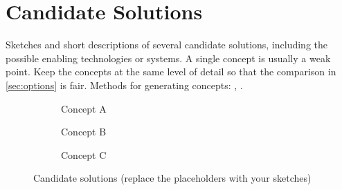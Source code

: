 \section{Candidate Solutions}
\label{sec:concepts}

\begin{guidance}
Sketches and short descriptions of several candidate solutions, including
the possible enabling technologies or systems. A single concept is usually a
weak point. Keep the concepts at the same level of detail so that the
comparison in \cref{sec:options} is fair. Methods for generating concepts:
\textcite{cross2008}, \textcite{dym2009}.
\end{guidance}

\begin{figure}[htbp]
  \centering
  \begin{subfigure}[b]{0.32\linewidth}
    \caption{Concept A}
  \end{subfigure}\hfill
  \begin{subfigure}[b]{0.32\linewidth}
    \caption{Concept B}
  \end{subfigure}\hfill
  \begin{subfigure}[b]{0.32\linewidth}
    \caption{Concept C}
  \end{subfigure}
  \caption{Candidate solutions (replace the placeholders with your sketches)}
  \label{fig:concepts}
\end{figure}
